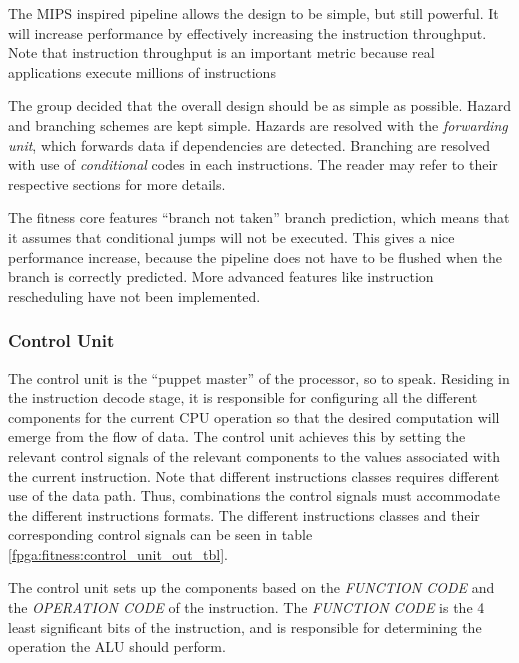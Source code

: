The MIPS inspired pipeline allows the design to be simple, but still powerful.
It  will increase performance by effectively increasing the instruction throughput.
Note that instruction throughput is an important metric because real applications execute millions of instructions \cite[p.~335]{compOrgDes}


The group decided that the overall design should be as simple as possible.
Hazard and branching schemes are kept simple.
Hazards are resolved with the \emph{forwarding unit}, which forwards data if dependencies are detected.
Branching are resolved with use of \emph{conditional} codes in each instructions.
The reader may refer to their respective sections for more details.

The fitness core features ``branch not taken'' branch prediction, which means that it assumes that conditional jumps will not be executed.
This gives a nice performance increase, because the pipeline does not have to be flushed when the branch is correctly predicted.
More advanced features like instruction rescheduling have not been implemented.

\newpage
\subsubsection{Control Unit} 

The control unit is the ``puppet master'' of the processor, so to speak.
Residing in the instruction decode stage, it is responsible for configuring all the different components for the current CPU operation so that the desired computation will emerge from the flow of data.
The control unit achieves this by setting the relevant control signals of the relevant components to the values associated with the current instruction.
Note that different instructions classes requires different use of the data path.
Thus, combinations the control signals must accommodate the different instructions formats. The different instructions classes and their corresponding control signals can be seen in table \ref{fpga:fitness:control_unit_out_tbl}. 

The control unit sets up the components based on the \emph{FUNCTION CODE} and the \emph{OPERATION CODE} of the instruction.
The \emph{FUNCTION CODE} is the 4 least significant bits of the instruction, and is responsible for determining the operation the ALU should perform. 


 


